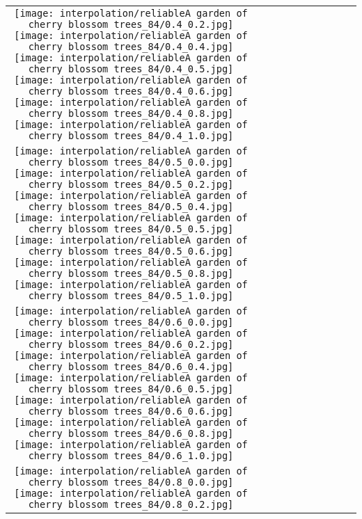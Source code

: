 \documentclass[10pt,twocolumn,letterpaper]{article}
\begin{document}
\begin{figure*}[tb!]
{\begin{tabular}{c c c c c c c c c c}
  \texttt{[image: interpolation/reliableA garden of cherry blossom trees\_84/0.4\_0.2.jpg]}
  \texttt{[image: interpolation/reliableA garden of cherry blossom trees\_84/0.4\_0.4.jpg]}
  \texttt{[image: interpolation/reliableA garden of cherry blossom trees\_84/0.4\_0.5.jpg]}
  \texttt{[image: interpolation/reliableA garden of cherry blossom trees\_84/0.4\_0.6.jpg]}
  \texttt{[image: interpolation/reliableA garden of cherry blossom trees\_84/0.4\_0.8.jpg]}
  \texttt{[image: interpolation/reliableA garden of cherry blossom trees\_84/0.4\_1.0.jpg]}
\tabularnewline
    \raisebox{0.1in}{\rotatebox{90}{\small \emph{}
 }}
  \texttt{[image: interpolation/reliableA garden of cherry blossom trees\_84/0.5\_0.0.jpg]}
  \texttt{[image: interpolation/reliableA garden of cherry blossom trees\_84/0.5\_0.2.jpg]}
  \texttt{[image: interpolation/reliableA garden of cherry blossom trees\_84/0.5\_0.4.jpg]}
  \texttt{[image: interpolation/reliableA garden of cherry blossom trees\_84/0.5\_0.5.jpg]}
  \texttt{[image: interpolation/reliableA garden of cherry blossom trees\_84/0.5\_0.6.jpg]}
  \texttt{[image: interpolation/reliableA garden of cherry blossom trees\_84/0.5\_0.8.jpg]}
  \texttt{[image: interpolation/reliableA garden of cherry blossom trees\_84/0.5\_1.0.jpg]}
\tabularnewline
    \raisebox{0.1in}{\rotatebox{90}{\small \emph{}
 }}
  \texttt{[image: interpolation/reliableA garden of cherry blossom trees\_84/0.6\_0.0.jpg]}
  \texttt{[image: interpolation/reliableA garden of cherry blossom trees\_84/0.6\_0.2.jpg]}
  \texttt{[image: interpolation/reliableA garden of cherry blossom trees\_84/0.6\_0.4.jpg]}
  \texttt{[image: interpolation/reliableA garden of cherry blossom trees\_84/0.6\_0.5.jpg]}
  \texttt{[image: interpolation/reliableA garden of cherry blossom trees\_84/0.6\_0.6.jpg]}
  \texttt{[image: interpolation/reliableA garden of cherry blossom trees\_84/0.6\_0.8.jpg]}
  \texttt{[image: interpolation/reliableA garden of cherry blossom trees\_84/0.6\_1.0.jpg]}
\tabularnewline
    \raisebox{0.1in}{\rotatebox{90}{\small \emph{}
 }}
  \texttt{[image: interpolation/reliableA garden of cherry blossom trees\_84/0.8\_0.0.jpg]}
  \texttt{[image: interpolation/reliableA garden of cherry blossom trees\_84/0.8\_0.2.jpg]}

\end{tabular}}
\end{figure*}
\end{document}
